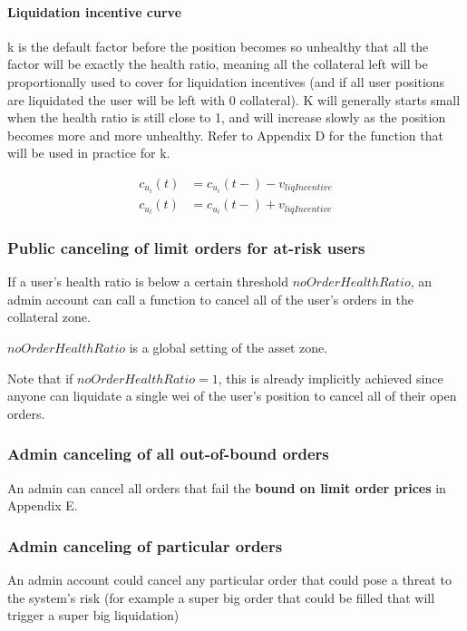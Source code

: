 \documentclass{article}%
\begin{document}
\paragraph{Liquidation incentive curve} k is the default factor before the position becomes so unhealthy that all the factor will be exactly the health ratio, meaning all the collateral left will be proportionally used to cover for liquidation incentives (and if all user positions are liquidated the user will be left with 0 collateral). K will generally starts small when the health ratio is still close to 1, and will increase slowly as the position becomes more and more unhealthy. Refer to Appendix D for the function that will be used in practice for k.

    \begin{align*}
        c_{u_i}(t) &= c_{u_i}(t-) - v_{liqIncentive}\\
        c_{u_l}(t) &= c_{u_l}(t-) + v_{liqIncentive}
    \end{align*}
\subsubsection{Public canceling of limit orders for at-risk users}
If a user's health ratio is below a certain threshold $noOrderHealthRatio$, an admin account can call a function to cancel all of the user's orders in the collateral zone.

$noOrderHealthRatio$ is a global setting of the asset zone.

Note that if $noOrderHealthRatio = 1$, this is already implicitly achieved since anyone can liquidate a single wei of the user's position to cancel all of their open orders.

\subsubsection{Admin canceling of all out-of-bound orders}
An admin can cancel all orders that fail the \textbf{bound on limit order prices} in Appendix E.

\subsubsection{Admin canceling of particular orders}
An admin account could cancel any particular order that could pose a threat to the system's risk (for example a super big order that could be filled that will trigger a super big liquidation)
\end{document}
